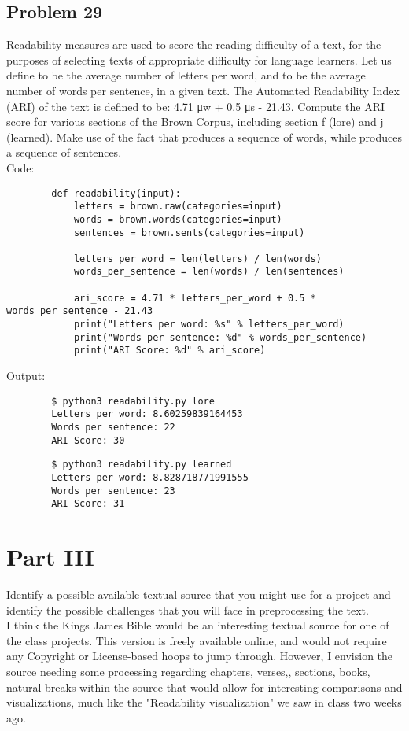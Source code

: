 \documentclass[12pt]{article}
\begin{document}
		
		\subsection*{Problem 29}
		Readability measures are used to score the reading difficulty of a text, for the purposes of selecting texts of appropriate difficulty for language learners. Let us define  to be the average number of letters per word, and  to be the average number of words per sentence, in a given text. The Automated Readability Index (ARI) of the text is defined to be: 4.71 μw + 0.5 μs - 21.43. Compute the ARI score for various sections of the Brown Corpus, including section f (lore) and j (learned). Make use of the fact that  produces a sequence of words, while  produces a sequence of sentences.\\
		
		Code:\\
		\begin{lstlisting}
		def readability(input):
			letters = brown.raw(categories=input)
			words = brown.words(categories=input)
			sentences = brown.sents(categories=input)
			
			letters_per_word = len(letters) / len(words)
			words_per_sentence = len(words) / len(sentences)
			
			ari_score = 4.71 * letters_per_word + 0.5 * words_per_sentence - 21.43
			print("Letters per word: %s" % letters_per_word)
			print("Words per sentence: %d" % words_per_sentence)
			print("ARI Score: %d" % ari_score)
		\end{lstlisting}
		
		
		Output:\\
		\begin{lstlisting}
		$ python3 readability.py lore
		Letters per word: 8.60259839164453
		Words per sentence: 22
		ARI Score: 30
		\end{lstlisting}
		
		\begin{lstlisting}
		$ python3 readability.py learned
		Letters per word: 8.828718771991555
		Words per sentence: 23
		ARI Score: 31
		\end{lstlisting}
		
	\section*{Part III}
	 Identify a possible available textual source that you might use for a project and identify the possible challenges that you will face in preprocessing the text. \\
	 
	 I think the Kings James Bible would be an interesting textual source for one of the class projects. This version is freely available online, and would not require any Copyright or License-based hoops to jump through. However, I envision the source needing some processing regarding chapters, verses,, sections, books, natural breaks within the source that would allow for interesting comparisons and visualizations, much like the "Readability visualization" we saw in class two weeks ago.
	
\end{document}
